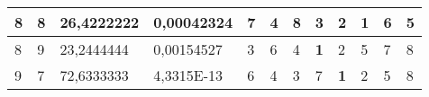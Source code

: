 \documentclass[conference]{IEEEtran}
\begin{document}
\begin{table*}[]
\begin{tabular}{|llll|llllllll|}
\multicolumn{1}{|l|}{8}                                                     & \multicolumn{1}{l|}{8}                                                        & \multicolumn{1}{l|}{26,4222222}                                                   & 0,00042324                     & \multicolumn{1}{l|}{7}                                                  & \multicolumn{1}{l|}{4}                                                  & \multicolumn{1}{l|}{8}                                                  & \multicolumn{1}{l|}{3}                                                  & \multicolumn{1}{l|}{2}                                                  & \multicolumn{1}{l|}{\textbf{1}}                                         & \multicolumn{1}{l|}{6}                                                  & 5                          \\ \hline
\multicolumn{1}{|l|}{8}                                                     & \multicolumn{1}{l|}{9}                                                        & \multicolumn{1}{l|}{23,2444444}                                                   & 0,00154527                     & \multicolumn{1}{l|}{3}                                                  & \multicolumn{1}{l|}{6}                                                  & \multicolumn{1}{l|}{4}                                                  & \multicolumn{1}{l|}{\textbf{1}}                                         & \multicolumn{1}{l|}{2}                                                  & \multicolumn{1}{l|}{5}                                                  & \multicolumn{1}{l|}{7}                                                  & 8                          \\ \hline
\multicolumn{1}{|l|}{9}                                                     & \multicolumn{1}{l|}{7}                                                        & \multicolumn{1}{l|}{72,6333333}                                                   & 4,3315E-13                     & \multicolumn{1}{l|}{6}                                                  & \multicolumn{1}{l|}{4}                                                  & \multicolumn{1}{l|}{3}                                                  & \multicolumn{1}{l|}{7}                                                  & \multicolumn{1}{l|}{\textbf{1}}                                         & \multicolumn{1}{l|}{2}                                                  & \multicolumn{1}{l|}{5}                                                  & 8                          \\ \hline

\end{tabular}
\end{table*}
\end{document}
